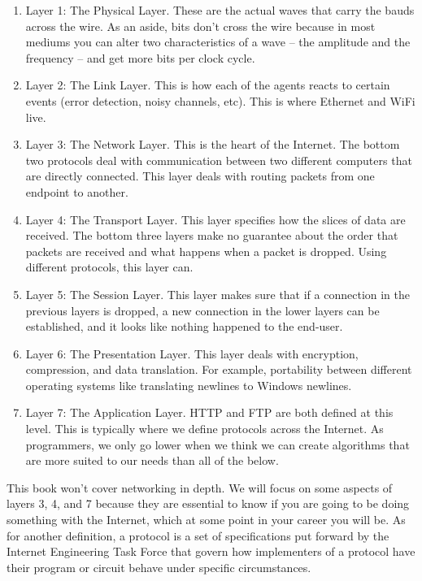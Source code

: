 \begin{enumerate}
\item Layer 1: The Physical Layer.
  These are the actual waves that carry the bauds across the wire.
  As an aside, bits don't cross the wire because in most mediums you can alter two characteristics of a wave -- the amplitude and the frequency -- and get more bits per clock cycle.

\item Layer 2: The Link Layer.
  This is how each of the agents reacts to certain events (error detection, noisy channels, etc).
  This is where Ethernet and WiFi live.

\item Layer 3: The Network Layer.
  This is the heart of the Internet.
  The bottom two protocols deal with communication between two different computers that are directly connected.
  This layer deals with routing packets from one endpoint to another.

\item Layer 4: The Transport Layer.
  This layer specifies how the slices of data are received.
  The bottom three layers make no guarantee about the order that packets are received and what happens when a packet is dropped.
  Using different protocols, this layer can.

\item Layer 5: The Session Layer.
  This layer makes sure that if a connection in the previous layers is dropped, a new connection in the lower layers can be established, and it looks like nothing happened to the end-user.

\item Layer 6: The Presentation Layer.
  This layer deals with encryption, compression, and data translation.
  For example, portability between different operating systems like translating newlines to Windows newlines.

\item Layer 7: The Application Layer.
  HTTP and FTP are both defined at this level.
  This is typically where we define protocols across the Internet.
  As programmers, we only go lower when we think we can create algorithms that are more suited to our needs than all of the below.

\end{enumerate}

This book won't cover networking in depth.
We will focus on some aspects of layers 3, 4, and 7 because they are essential to know if you are going to be doing something with the Internet, which at some point in your career you will be.
As for another definition, a protocol is a set of specifications put forward by the Internet Engineering Task Force that govern how implementers of a protocol have their program or circuit behave under specific circumstances.

